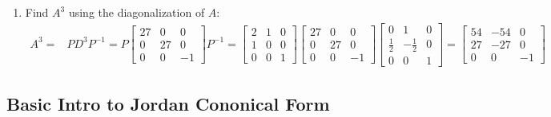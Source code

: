 \begin{enumerate}
\begin{align*}
\begin{bmatrix}
            0 \\
            0 \\
            1
        \end{bmatrix} \\
        \therefore \quad &D = \text{diag}(3, 3, -1) \text{ and } P = \begin{bmatrix}
            2 & 1 & 0 \\
            1 & 0 & 0 \\
            0 & 0 & 1
        \end{bmatrix} \text{ is the diagonalized form of } A
    \end{align*}
    \item Find $A^3$ using the diagonalization of $A$:
    \begin{align*}
        A^3 = &PD^3P^{-1} = P\begin{bmatrix}
            27 & 0 & 0 \\
            0 & 27 & 0 \\
            0 & 0 & -1
        \end{bmatrix}P^{-1} = \begin{bmatrix}
            2 & 1 & 0 \\
            1 & 0 & 0 \\
            0 & 0 & 1
        \end{bmatrix}\begin{bmatrix}
            27 & 0 & 0 \\
            0 & 27 & 0 \\
            0 & 0 & -1
        \end{bmatrix}\begin{bmatrix}
            0 & 1 & 0 \\
            \frac{1}{2} & -\frac{1}{2} & 0 \\
            0 & 0 & 1
        \end{bmatrix} = \begin{bmatrix}
            54 & -54 & 0 \\
            27 & -27 & 0 \\
            0 & 0 & -1
        \end{bmatrix}
    \end{align*}
\end{enumerate}


\pagebreak

\subsection*{Basic Intro to Jordan Cononical Form}
